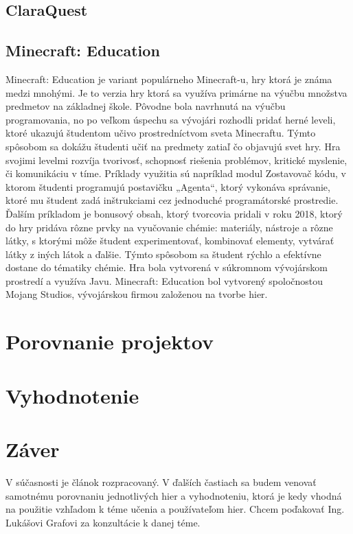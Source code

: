 \documentclass[10pt,oneside,slovak,a4paper]{article}
\begin{document}
\subsection{ClaraQuest}

\subsection{Minecraft: Education}
Minecraft: Education je variant populárneho Minecraft-u, hry ktorá je známa medzi mnohými. Je to verzia hry ktorá sa využíva primárne na výučbu množstva predmetov na základnej škole. Pôvodne bola navrhnutá na výučbu programovania, no po veľkom úspechu sa vývojári rozhodli pridať herné leveli, ktoré ukazujú študentom učivo prostredníctvom sveta Minecraftu. Týmto spôsobom sa dokážu študenti učiť na predmety  zatiaľ čo objavujú svet hry. Hra svojimi levelmi rozvíja tvorivosť, schopnosť riešenia problémov, kritické myslenie, či komunikáciu v tíme. Príklady využitia sú napríklad modul Zostavovač kódu, v ktorom študenti programujú postavičku „Agenta“, ktorý vykonáva správanie, ktoré mu študent zadá inštrukciami cez jednoduché programátorské prostredie. Ďalším príkladom je bonusový obsah, ktorý tvorcovia pridali v roku 2018, ktorý do hry pridáva rôzne prvky na vyučovanie chémie: materiály, nástroje a rôzne látky, s ktorými môže študent experimentovať, kombinovať elementy, vytvárať látky z iných látok a ďalšie. Týmto spôsobom sa študent rýchlo a efektívne dostane do tématiky chémie. Hra bola vytvorená v súkromnom vývojárskom prostredí a využíva Javu. Minecraft: Education bol vytvorený spoločnostou Mojang Studios, vývojárskou firmou založenou na tvorbe hier. 

\section{Porovnanie projektov}

\section{Vyhodnotenie}

\section{Záver}
V súčasnosti je článok rozpracovaný. V ďalších častiach sa budem venovať samotnému porovnaniu jednotlivých hier a vyhodnoteniu, ktorá je kedy vhodná na použitie vzhľadom k téme učenia a používateľom hier. Chcem poďakovať Ing. Lukášovi Grafovi za konzultácie k danej téme.



\end{document}
